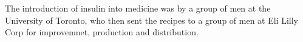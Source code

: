 \documentclass[12pt]{article}
\begin{document}
The introduction of insulin into medicine was by a group of men at the University of Toronto, who then sent the recipes to a group of men at Eli Lilly Corp for improvemnet, production and distribution. 


\newpage
\singlespacing


\end{document}
